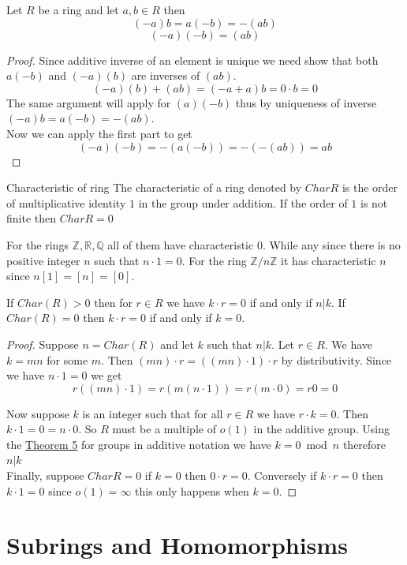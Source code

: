 \documentclass[16pt,a4paper]{article}
\theoremstyle{definition}
\begin{document}
\begin{thm}{}{}
Let $R$ be a ring and let $a,b\in R$ then 
\[(-a)b=a(-b) = -(ab)\]
\[(-a)(-b) = (ab)\]
\end{thm}
\begin{proof}
Since additive inverse of an element is unique we need show that both $a(-b)$ and $(-a)(b)$ are inverses of $(ab)$. 
\[(-a)(b) +(ab) = (-a+a)b = 0\cdot b = 0\]
The same argument will apply for $(a)(-b)$ thus by uniqueness of inverse $(-a)b=a(-b) = -(ab)$. 
\\
Now we can apply the first part to get
\[(-a)(-b) = -(a(-b))=-(-(ab)) = ab\]
\end{proof}

\begin{defn}{Characteristic of ring}{}
The characteristic of a ring denoted by $Char R$ is the order of multiplicative identity $1$ in the group under addition. If the order of $1$ is not finite then $Char R = 0$
\end{defn}
For the rings $\mathbb{Z,R,Q}$ all of them have characteristic 0. While any since there is no positive integer $n$ such that $n\cdot 1 = 0$.  For the ring $\mathbb{Z}/n\mathbb{Z}$ it has characteristic $n$ since $n[1] = [n] = [0]$. 

\newpage

\begin{thm}{}{}
If $Char(R) > 0$ then for $r\in R$ we have $k\cdot r = 0$ if and only if $n|k$. If $Char(R)= 0$ then $k\cdot r = 0$ if and only if $k=0$. 
\end{thm}
\begin{proof}
Suppose $n=Char(R)$ and let $k$ such that $n|k$. Let $r\in R$. We have $k=mn$ for some $m$. Then $(mn)\cdot r = ((mn)\cdot 1)\cdot r$ by distributivity.  Since we have $n\cdot 1 = 0$ we get 
\[r((mn)\cdot 1) = r(m(n\cdot 1)) = r(m\cdot 0) = r0 = 0\]

Now suppose $k$ is an integer such that for all $r\in R$ we have $r\cdot k = 0$. Then $k\cdot 1 = 0 = n\cdot 0$. So $R$ must be a multiple of $o(1)$ in the additive group. Using the \hyperref[thm5]{Theorem 5} for groups in additive notation we have $k=0\bmod n$ therefore $n|k$
\\
Finally, suppose $Char R = 0$ if $k=0$ then $0\cdot r = 0$. Conversely if $k\cdot r = 0$ then $k\cdot 1 = 0$ since $o(1)=\infty$ this only happens when $k=0$. 

\end{proof}


\section{Subrings and Homomorphisms}
\end{document}
